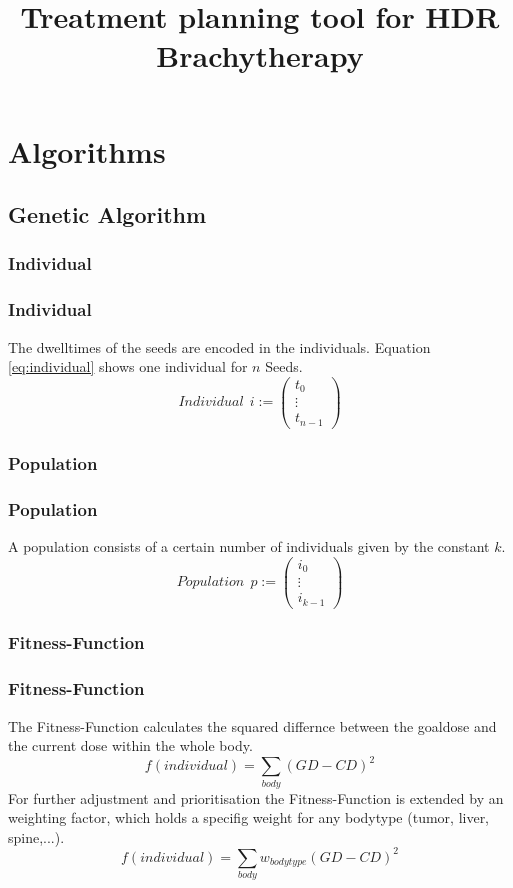 \documentclass{beamer}
\author[Elm S. \& Karthe T. \& Golebiewski D. \& Schröder M.E.]
{%
   \texorpdfstring{
        \begin{columns}
            \column{.45\linewidth}
            \centering
            \RBox{Elm S.\\
            \href{mailto:subhamsoni0049@pec.edu}{subhamsoni0049@pec.edu}}
            \column{.45\linewidth}
            \centering
            \RBox{Karthe T.\\
            \href{mailto:thobias.karthe@tuhh.de}{thobias.karthe@tuhh.de}}
        \end{columns}
        \vspace{0.5cm}
        \begin{columns}
            \column{.45\linewidth}
            \centering
            \RBox{Golebiewski D.\\
            \href{mailto:subhamsoni0049@pec.edu}{subhamsoni0049@pec.edu}}
            \column{.45\linewidth}
            \centering
            \RBox{Schröder M.E.\\
            \href{mailto:malte.schroeder@tuhh.de}{malte.schroeder@tuhh.de}}
        \end{columns}
        \vspace{-0.3cm}
        \begin{columns}
          \column{0.3\linewidth}
          \raggedleft
            \vspace{-4.8cm}
            \column{0.6\linewidth}
            \raggedright
            Institute of Medical Technology\\[1.1ex]
            TUHH
            \vspace{-4.8cm}
        \end{columns}
   }
   {John Doe \& Jane Doe}
}
\title{Treatment planning tool for HDR Brachytherapy}
\begin{document}
\begin{frame}
\titlepage
\end{frame}
\frame{\tableofcontents}

\section{Algorithms}
\subsection{Genetic Algorithm}
\frame{\tableofcontents[currentsubsection]}
\subsubsection{Individual}

 \begin{frame}
 \frametitle{Individual}
 The dwelltimes of the seeds are encoded in the individuals. Equation \eqref{eq:individual} shows one individual for $n  $ Seeds.
 \begin{equation}
 \label{eq:individual}
 Individual \ \ i := \begin{pmatrix}
 t_{0} \\ \vdots \\ t_{n-1} 	
\end{pmatrix}   
 \end{equation}
 \end{frame}
 
\subsubsection{Population}
 \begin{frame}
 \frametitle{Population}
 A population consists of a certain number of individuals given by the constant $ k $.
 \begin{equation}
 \label{eq:population}
 Population \ \ p := \begin{pmatrix}
 i_{0} \\ \vdots \\ i_{k-1} 	
\end{pmatrix}   
 \end{equation}
 \end{frame}
 
 \subsubsection{Fitness-Function}
 \begin{frame}
 \frametitle{Fitness-Function}
 The Fitness-Function calculates the squared differnce between the goaldose and the current dose within the whole body.
 \begin{equation}
 f(individual) = \sum_{body}(GD-CD)^2
 \end{equation}
 For further adjustment and prioritisation the Fitness-Function is extended by an weighting factor, which holds a specifig weight for any bodytype (tumor, liver, spine,...).
 \begin{equation}
 f(individual) = \sum_{body}w_{bodytype}(GD-CD)^2
 \end{equation}
 \end{frame}
 
\end{document}
